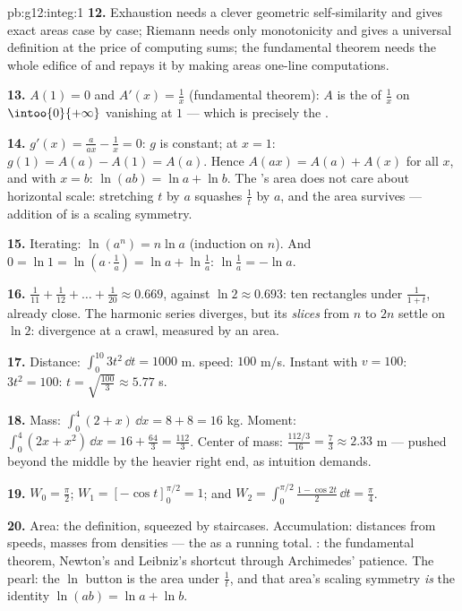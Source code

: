 \begin{solution}{pb:g12:integ:1}
\textbf{12.} Exhaustion needs a clever geometric
self-similarity and gives exact areas case by case; Riemann
needs only monotonicity and gives a universal definition at
the price of computing sums; the fundamental theorem needs the
whole edifice of  and repays it by making areas
one-line computations.

\textbf{13.} $A(1) = 0$ and $A'(x) = \frac1x$ (fundamental
theorem): $A$ is the  of $\frac1x$ on
$\intoo{0}{+\infty}$ vanishing at $1$ --- which is precisely
the .

\textbf{14.} $g'(x) = \frac{a}{ax} - \frac1x = 0$: $g$ is
constant; at $x = 1$: $g(1) = A(a) - A(1) = A(a)$. Hence
$A(ax) = A(a) + A(x)$ for all $x$, and with $x = b$:
$\ln(ab) = \ln a + \ln b$. The 's area does not care
about horizontal scale: stretching $t$ by $a$ squashes
$\frac1t$ by $a$, and the area survives --- addition of
 is a scaling symmetry.

\textbf{15.} Iterating: $\ln(a^n) = n\ln a$ (induction on
$n$). And $0 = \ln 1 = \ln\left(a \cdot \frac1a\right) =
\ln a + \ln\frac1a$: $\ln\frac1a = -\ln a$.

\textbf{16.} $\frac{1}{11} + \frac{1}{12} + \dots +
\frac{1}{20} \approx 0.669$, against $\ln 2 \approx 0.693$:
ten rectangles under $\frac{1}{1+t}$, already close. The
harmonic series diverges, but its \emph{slices} from $n$ to
$2n$ settle on $\ln 2$: divergence at a crawl, measured by an
area.

\textbf{17.} Distance: $\int_0^{10} 3t^2\,\dd t = 1000$ m.
 speed: $100$ m/s. Instant with $v = 100$:
$3t^2 = 100$: $t = \sqrt{\frac{100}{3}} \approx 5.77$ s.

\textbf{18.} Mass: $\int_0^4 (2 + x)\,\dd x = 8 + 8 = 16$ kg.
Moment: $\int_0^4 (2x + x^2)\,\dd x = 16 + \frac{64}{3} =
\frac{112}{3}$. Center of mass:
$\frac{112/3}{16} = \frac73 \approx 2.33$ m --- pushed beyond
the middle by the heavier right end, as intuition demands.

\textbf{19.} $W_0 = \frac\pi2$; $W_1 = \left[-\cos
t\right]_0^{\pi/2} = 1$; and
$W_2 = \int_0^{\pi/2} \frac{1 - \cos 2t}{2}\,\dd t =
\frac\pi4$.

\textbf{20.} Area: the definition, squeezed by staircases.
Accumulation: distances from speeds, masses from densities ---
the  as a running total. : the
fundamental theorem, Newton's and Leibniz's shortcut through
Archimedes' patience. The pearl: the $\ln$ button is the area
under $\frac1t$, and that area's scaling symmetry \emph{is}
the identity $\ln(ab) = \ln a + \ln b$.
\end{solution}
